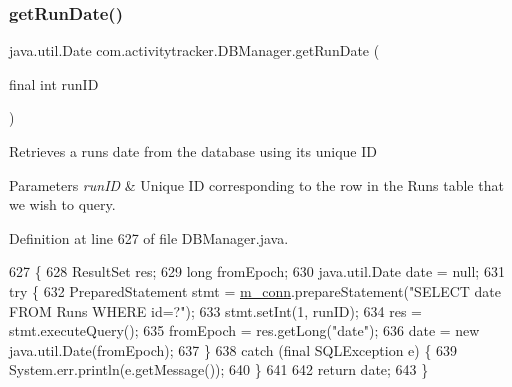 \subsubsection{\texorpdfstring{get\+Run\+Date()}{getRunDate()}}
{\footnotesize\ttfamily java.\+util.\+Date com.\+activitytracker.\+D\+B\+Manager.\+get\+Run\+Date (\begin{DoxyParamCaption}\item[{final int}]{run\+ID }\end{DoxyParamCaption})}

Retrieves a run\textquotesingle{}s date from the database using its unique ID


\begin{DoxyParams}{Parameters}
{\em run\+ID} & Unique ID corresponding to the row in the Runs table that we wish to query. \\
\hline
\end{DoxyParams}


Definition at line 627 of file D\+B\+Manager.\+java.


\begin{DoxyCode}
627                                                       \{
628         ResultSet res;
629         \textcolor{keywordtype}{long} fromEpoch;
630         java.util.Date date = null;
631         \textcolor{keywordflow}{try} \{
632             PreparedStatement stmt = \mbox{\hyperlink{classcom_1_1activitytracker_1_1_d_b_manager_a064088d13ac09eb147fdc19268771521}{m\_conn}}.prepareStatement(\textcolor{stringliteral}{"SELECT date FROM Runs WHERE id=?"});
633             stmt.setInt(1, runID);
634             res = stmt.executeQuery();
635             fromEpoch = res.getLong(\textcolor{stringliteral}{"date"});
636             date = \textcolor{keyword}{new} java.util.Date(fromEpoch);
637         \}
638         \textcolor{keywordflow}{catch} (\textcolor{keyword}{final} SQLException e) \{
639             System.err.println(e.getMessage());
640         \}
641 
642         \textcolor{keywordflow}{return} date;
643     \}
\end{DoxyCode}
\mbox{\label{classcom_1_1activitytracker_1_1_d_b_manager_a666452f1e5862f90c06b0beb9a9fcfdd}} 
